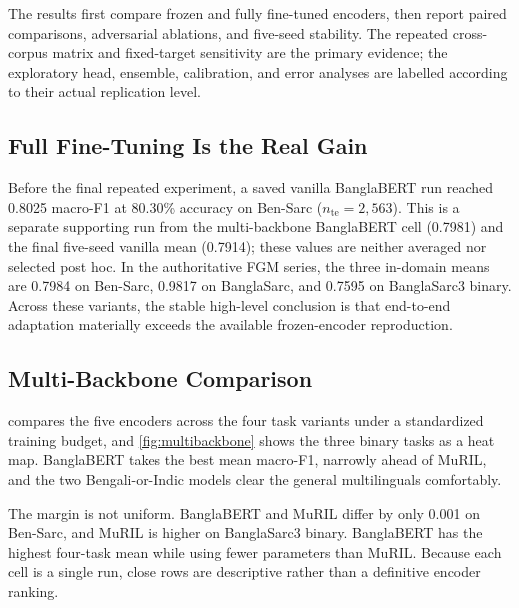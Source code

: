 \documentclass{ieeeaccess}
\begin{document}
The results first compare frozen and fully fine-tuned encoders, then report paired comparisons, adversarial ablations, and five-seed stability. The repeated cross-corpus matrix and fixed-target sensitivity are the primary evidence; the exploratory head, ensemble, calibration, and error analyses are labelled according to their actual replication level.

\subsection{Full Fine-Tuning Is the Real Gain}
\label{sec:bangla-baseline}

Before the final repeated experiment, a saved vanilla BanglaBERT run reached 0.8025 macro-F1 at 80.30\% accuracy on Ben-Sarc ($n_{\mathrm{te}}=2{,}563$). This is a separate supporting run from the multi-backbone BanglaBERT cell (0.7981) and the final five-seed vanilla mean (0.7914); these values are neither averaged nor selected post hoc. In the authoritative FGM series, the three in-domain means are 0.7984 on Ben-Sarc, 0.9817 on BanglaSarc, and 0.7595 on BanglaSarc3 binary. Across these variants, the stable high-level conclusion is that end-to-end adaptation materially exceeds the available frozen-encoder reproduction.


\subsection{Multi-Backbone Comparison}
\label{sec:multibackbone-results}

 compares the five encoders across the four task variants under a standardized training budget, and \cref{fig:multibackbone} shows the three binary tasks as a heat map. BanglaBERT takes the best mean macro-F1, narrowly ahead of MuRIL, and the two Bengali-or-Indic models clear the general multilinguals comfortably.

The margin is not uniform. BanglaBERT and MuRIL differ by only 0.001 on Ben-Sarc, and MuRIL is higher on BanglaSarc3 binary. BanglaBERT has the highest four-task mean while using fewer parameters than MuRIL. Because each cell is a single run, close rows are descriptive rather than a definitive encoder ranking.
\end{document}
